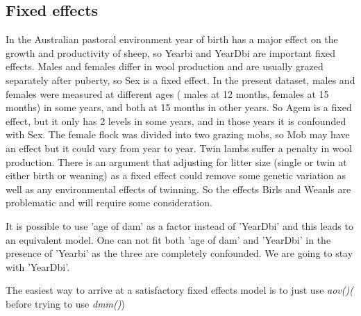 \documentclass[titlepage]{article}  %
\begin{document}
\subsection{Fixed effects}
In the Australian pastoral environment year of birth has a major effect on the growth and productivity of sheep, so Yearbi and YearDbi are important fixed effects. Males and females differ in wool production and are usually grazed separately after puberty, so Sex is a fixed effect. In the present dataset, males and females were measured at different ages ( males at 12 months, females at 15 months) in some years, and both at 15 months in other years. So Agem is a fixed effect, but it only has 2 levels in some years, and in those years it is confounded with Sex. The female flock was divided into two grazing mobs, so Mob may have an effect but it could vary from year to year. Twin lambs suffer a penalty in wool production. There is an argument that adjusting for litter size (single or twin at either birth or weaning) as a fixed effect could remove some genetic variation as well as any environmental effects of twinning. So the effects Birls and Weanls are problematic and will require some consideration.

It is possible to use 'age of dam' as a factor instead of 'YearDbi' and this leads to an equivalent model. One can not fit both 'age of dam' and 'YearDbi' in the presence of 'Yearbi' as the three are completely confounded. We are going to stay with 'YearDbi'.

The easiest way to arrive at a satisfactory fixed effects model is to just use {\em aov()(} before trying to use {\em dmm()})
\end{document}
